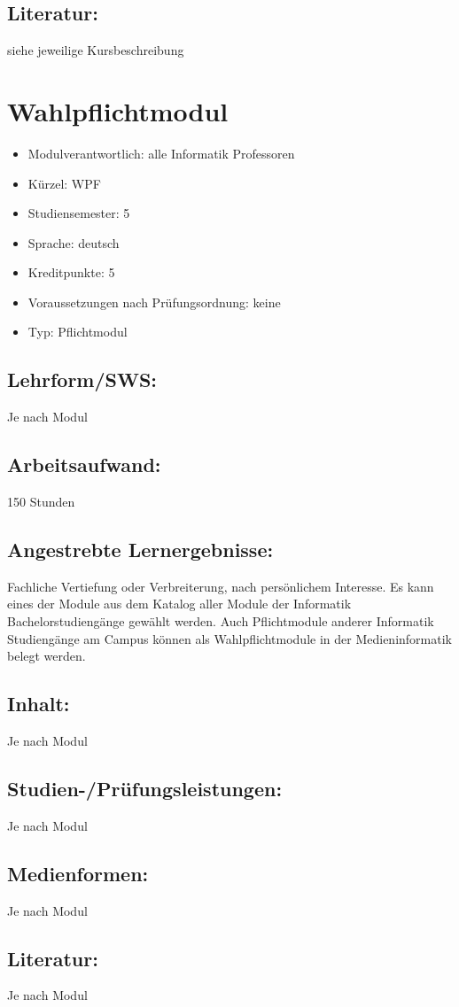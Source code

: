 \section*{Literatur:}\label{literatur-23}

siehe jeweilige Kursbeschreibung

\chapter{Wahlpflichtmodul}\label{wahlpflichtmodul}

\begin{itemize}
\tightlist
\item
  Modulverantwortlich: alle Informatik Professoren
\item
  Kürzel: WPF
\item
  Studiensemester: 5
\item
  Sprache: deutsch
\item
  Kreditpunkte: 5
\item
  Voraussetzungen nach Prüfungsordnung: keine
\item
  Typ: Pflichtmodul
\end{itemize}

\section*{Lehrform/SWS:}\label{lehrformsws-28}

Je nach Modul

\section*{Arbeitsaufwand:}\label{arbeitsaufwand-27}

150 Stunden

\section*{Angestrebte
Lernergebnisse:}\label{angestrebte-lernergebnisse-28}

Fachliche Vertiefung oder Verbreiterung, nach persönlichem Interesse. Es
kann eines der Module aus dem Katalog aller Module der Informatik
Bachelorstudiengänge gewählt werden. Auch Pflichtmodule anderer
Informatik Studiengänge am Campus können als Wahlpflichtmodule in der
Medieninformatik belegt werden.

\section*{Inhalt:}\label{inhalt-28}

Je nach Modul

\section*{Studien-/Prüfungsleistungen:}\label{studien-pruxfcfungsleistungen-26}

Je nach Modul

\section*{Medienformen:}\label{medienformen-19}

Je nach Modul

\section*{Literatur:}\label{literatur-24}

Je nach Modul
